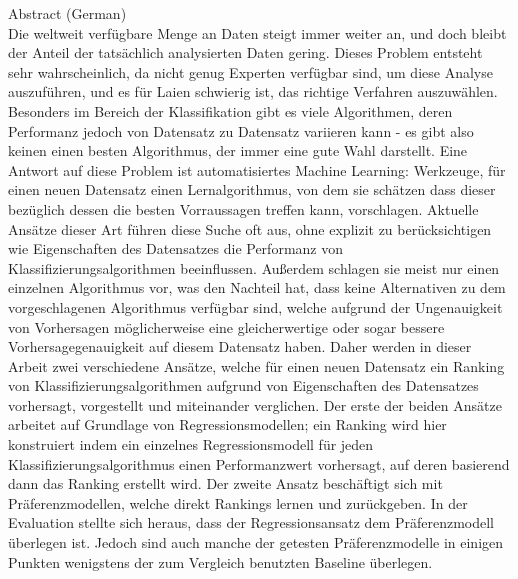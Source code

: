 {Abstract (German)}\label{sec:abstract-german} \\

Die weltweit verfügbare Menge an Daten steigt immer weiter an, und doch bleibt der Anteil der tatsächlich analysierten Daten gering. Dieses Problem entsteht sehr wahrscheinlich, da nicht genug Experten verfügbar sind, um diese Analyse auszuführen, und es für Laien schwierig ist, das richtige Verfahren auszuwählen. Besonders im Bereich der Klassifikation gibt es viele Algorithmen, deren Performanz jedoch von Datensatz zu Datensatz variieren kann - es gibt also keinen einen besten Algorithmus, der immer eine gute Wahl darstellt. Eine Antwort auf diese Problem ist automatisiertes Machine Learning: Werkzeuge, für einen neuen Datensatz einen Lernalgorithmus, von dem sie schätzen dass dieser bezüglich dessen die besten Vorraussagen treffen kann, vorschlagen. Aktuelle Ansätze dieser Art führen diese Suche oft aus, ohne explizit zu berücksichtigen wie Eigenschaften des Datensatzes die Performanz von Klassifizierungsalgorithmen beeinflussen. Außerdem schlagen sie meist nur einen einzelnen Algorithmus vor, was den Nachteil hat, dass keine Alternativen zu dem vorgeschlagenen Algorithmus verfügbar sind, welche aufgrund der Ungenauigkeit von Vorhersagen möglicherweise eine gleicherwertige oder sogar bessere Vorhersagegenauigkeit auf diesem Datensatz haben. Daher werden in dieser Arbeit zwei verschiedene Ansätze, welche für einen neuen Datensatz ein Ranking von Klassifizierungsalgorithmen aufgrund von Eigenschaften des Datensatzes vorhersagt, vorgestellt und miteinander verglichen. Der erste der beiden Ansätze arbeitet auf Grundlage von Regressionsmodellen; ein Ranking wird hier konstruiert indem ein einzelnes Regressionsmodell für jeden Klassifizierungsalgorithmus einen Performanzwert vorhersagt, auf deren basierend dann das Ranking erstellt wird. Der zweite Ansatz beschäftigt sich mit Präferenzmodellen, welche direkt Rankings lernen und zurückgeben. In der Evaluation stellte sich heraus, dass der Regressionsansatz dem Präferenzmodell überlegen ist. Jedoch sind auch manche der getesten Präferenzmodelle in einigen Punkten wenigstens der zum Vergleich benutzten Baseline überlegen. 